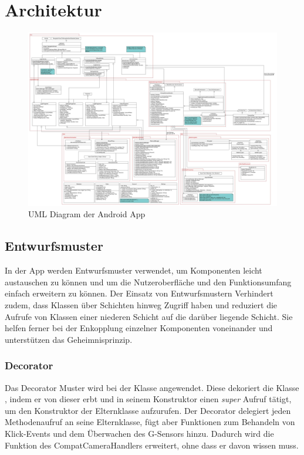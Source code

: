 \section{Architektur}

\begin{figure}[ht]
	\centering
\includegraphics[width=1\textwidth]{./resources/Diagramme/App/UMLAndroidApp.jpg}
\caption{UML Diagram der Android App}
	\label{fig:modules_overview}
\end{figure}

\subsection{Entwurfsmuster}
In der App werden Entwurfsmuster verwendet, um Komponenten leicht austauschen zu können und um die Nutzeroberfläche und den Funktionsumfang einfach erweitern zu können. Der Einsatz von Entwurfsmustern Verhindert  zudem, dass Klassen über Schichten hinweg Zugriff haben und reduziert die Aufrufe von Klassen einer niederen Schicht auf die darüber liegende Schicht. Sie helfen ferner bei der Enkopplung einzelner Komponenten voneinander und unterstützen das Geheimnisprinzip.

\subsubsection{Decorator}
Das Decorator Muster wird bei der Klasse  angewendet. Diese dekoriert die Klasse , indem er von dieser erbt und in seinem Konstruktor einen \textit{super} Aufruf tätigt, um den Konstruktor der Elternklasse aufzurufen. Der Decorator delegiert jeden Methodenaufruf an seine Elternklasse, fügt aber Funktionen zum Behandeln von Klick-Events und dem Überwachen des G-Sensors hinzu.
Dadurch wird die Funktion des CompatCameraHandlers erweitert, ohne dass er davon wissen muss.


